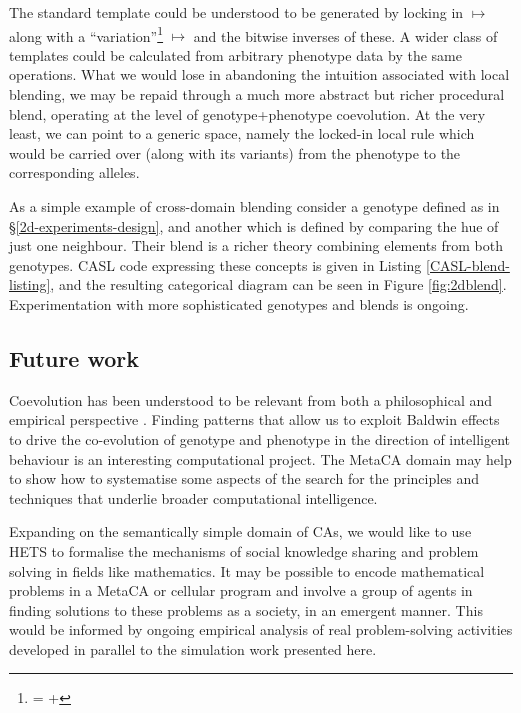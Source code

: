 \documentclass{AISB2008}
\makeatletter
\renewcommand{\boxed}[1]{\text{\fboxsep=.2em\fbox{\m@th$\displaystyle#1$}}}
\newcommand{\mystrut}{\vphantom{b\gamma}}
\makeatother
\begin{document}
The standard template could be understood to be generated by locking in
%
\boxed{0\mystrut}\boxed{0\mystrut}\boxed{0\mystrut} $\mapsto$ \boxed{0\mystrut}
%
along with a ``variation''\footnote{%
%
\boxed{0\mystrut}\boxed{1\mystrut}\boxed{0\mystrut} =
%
\boxed{0\mystrut}\boxed{0\mystrut}\boxed{0\mystrut} +
%
\boxed{\:\:\:\mystrut}\boxed{1\mystrut}\boxed{\:\:\:\mystrut}}
\boxed{0\mystrut}\boxed{1\mystrut}\boxed{0\mystrut} $\mapsto$
\boxed{0\mystrut} and the bitwise inverses of these.  A wider class of
templates could be calculated from arbitrary phenotype data by the same
operations.  What we would lose in abandoning the intuition associated
with local blending, we may be repaid through a much more abstract
but richer procedural blend, operating at the level of
genotype+phenotype coevolution.  At the very least, we can point to a
generic space, namely the locked-in local rule which would be carried
over (along with its variants) from the phenotype to the corresponding
alleles.

As a simple example of cross-domain blending consider a genotype
defined as in \S\ref{2d-experiments-design}, and another which is
defined by comparing the hue of just one neighbour.  Their blend is a
richer theory combining elements from both genotypes.  CASL code
expressing these concepts is given in Listing
\ref{CASL-blend-listing}, and the resulting categorical diagram can be
seen in Figure \ref{fig:2dblend}.  Experimentation with more
sophisticated genotypes and blends is ongoing.

\subsection{Future work}

Coevolution has been understood to be relevant from both a
philosophical \cite{mead1932philosophy} and empirical perspective
\cite{van1973new}.  Finding patterns that allow us to exploit Baldwin
effects to drive the co-evolution of genotype and phenotype in the
direction of intelligent behaviour is an interesting computational
project.  The MetaCA domain may help to show how to systematise some
aspects of the search for the principles and techniques that underlie
broader computational intelligence.

Expanding on the semantically simple domain of CAs, we would like to use
HETS to formalise the mechanisms of social knowledge sharing and
problem solving in fields like mathematics.  It may be possible to
encode mathematical problems in a MetaCA or cellular program and
involve a group of agents in finding solutions to these problems as a
society, in an emergent manner.  This would be informed by ongoing
empirical analysis of real problem-solving activities \cite{eca}
developed in parallel to the simulation work presented here.
\end{document}
